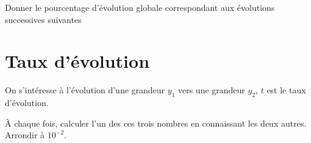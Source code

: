 \begin{questions}
	
	
	\question[3] Donner le pourcentage d'évolution globale correspondant aux évolutions successives suivantes
	
\end{questions}


\newpage

\section{Taux d'évolution}
On s'intéresse à l'évolution d'une grandeur $y_1$ vers une grandeur $y_2$, $t$ est le taux d'évolution.

\`A chaque fois, calculer l'un des ces trois nombres en connaissant les deux autres.
Arrondir à $10^{-2}$.

